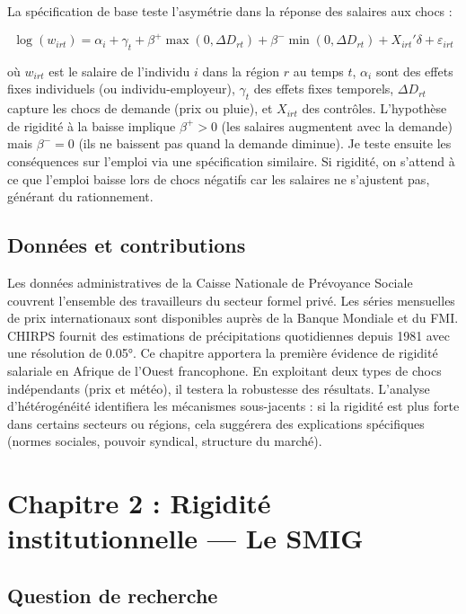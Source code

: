 \documentclass[12pt,a4paper]{article}
\begin{document}
La spécification de base teste l'asymétrie dans la réponse des salaires aux chocs :

\begin{equation}
\log(w_{irt}) = \alpha_i + \gamma_t + \beta^+ \max(0, \Delta D_{rt}) + \beta^- \min(0, \Delta D_{rt}) + X_{irt}'\delta + \varepsilon_{irt}
\end{equation}

où $w_{irt}$ est le salaire de l'individu $i$ dans la région $r$ au temps $t$, $\alpha_i$ sont des effets fixes individuels (ou individu-employeur), $\gamma_t$ des effets fixes temporels, $\Delta D_{rt}$ capture les chocs de demande (prix ou pluie), et $X_{irt}$ des contrôles. L'hypothèse de rigidité à la baisse implique $\beta^+ > 0$ (les salaires augmentent avec la demande) mais $\beta^- = 0$ (ils ne baissent pas quand la demande diminue). Je teste ensuite les conséquences sur l'emploi via une spécification similaire. Si rigidité, on s'attend à ce que l'emploi baisse lors de chocs négatifs car les salaires ne s'ajustent pas, générant du rationnement.

\subsection{Données et contributions}

Les données administratives de la Caisse Nationale de Prévoyance Sociale couvrent l'ensemble des travailleurs du secteur formel privé. Les séries mensuelles de prix internationaux sont disponibles auprès de la Banque Mondiale et du FMI. CHIRPS fournit des estimations de précipitations quotidiennes depuis 1981 avec une résolution de 0.05°. Ce chapitre apportera la première évidence de rigidité salariale en Afrique de l'Ouest francophone. En exploitant deux types de chocs indépendants (prix et météo), il testera la robustesse des résultats. L'analyse d'hétérogénéité identifiera les mécanismes sous-jacents : si la rigidité est plus forte dans certains secteurs ou régions, cela suggérera des explications spécifiques (normes sociales, pouvoir syndical, structure du marché).

\section{Chapitre 2 : Rigidité institutionnelle — Le SMIG}

\subsection{Question de recherche}
\end{document}
